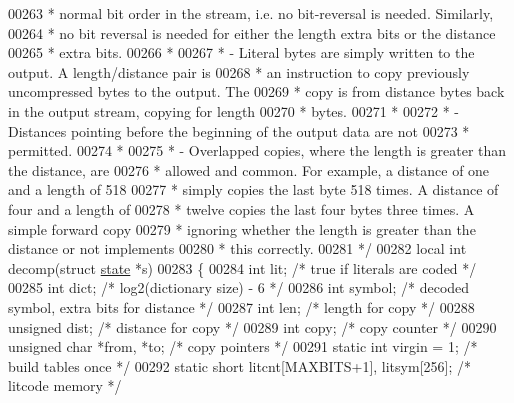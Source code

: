 \begin{DoxyCode}
00263 \textcolor{comment}{ *   normal bit order in the stream, i.e. no bit-reversal is needed. Similarly,}
00264 \textcolor{comment}{ *   no bit reversal is needed for either the length extra bits or the distance}
00265 \textcolor{comment}{ *   extra bits.}
00266 \textcolor{comment}{ *}
00267 \textcolor{comment}{ * - Literal bytes are simply written to the output.  A length/distance pair is}
00268 \textcolor{comment}{ *   an instruction to copy previously uncompressed bytes to the output.  The}
00269 \textcolor{comment}{ *   copy is from distance bytes back in the output stream, copying for length}
00270 \textcolor{comment}{ *   bytes.}
00271 \textcolor{comment}{ *}
00272 \textcolor{comment}{ * - Distances pointing before the beginning of the output data are not}
00273 \textcolor{comment}{ *   permitted.}
00274 \textcolor{comment}{ *}
00275 \textcolor{comment}{ * - Overlapped copies, where the length is greater than the distance, are}
00276 \textcolor{comment}{ *   allowed and common.  For example, a distance of one and a length of 518}
00277 \textcolor{comment}{ *   simply copies the last byte 518 times.  A distance of four and a length of}
00278 \textcolor{comment}{ *   twelve copies the last four bytes three times.  A simple forward copy}
00279 \textcolor{comment}{ *   ignoring whether the length is greater than the distance or not implements}
00280 \textcolor{comment}{ *   this correctly.}
00281 \textcolor{comment}{ */}
00282 local \textcolor{keywordtype}{int} decomp(\textcolor{keyword}{struct} \hyperlink{structstate}{state} *s)
00283 \{
00284     \textcolor{keywordtype}{int} lit;            \textcolor{comment}{/* true if literals are coded */}
00285     \textcolor{keywordtype}{int} dict;           \textcolor{comment}{/* log2(dictionary size) - 6 */}
00286     \textcolor{keywordtype}{int} symbol;         \textcolor{comment}{/* decoded symbol, extra bits for distance */}
00287     \textcolor{keywordtype}{int} len;            \textcolor{comment}{/* length for copy */}
00288     \textcolor{keywordtype}{unsigned} dist;      \textcolor{comment}{/* distance for copy */}
00289     \textcolor{keywordtype}{int} copy;           \textcolor{comment}{/* copy counter */}
00290     \textcolor{keywordtype}{unsigned} \textcolor{keywordtype}{char} *from, *to;   \textcolor{comment}{/* copy pointers */}
00291     \textcolor{keyword}{static} \textcolor{keywordtype}{int} virgin = 1;                              \textcolor{comment}{/* build tables once */}
00292     \textcolor{keyword}{static} \textcolor{keywordtype}{short} litcnt[MAXBITS+1], litsym[256];        \textcolor{comment}{/* litcode memory */}

\end{DoxyCode}
